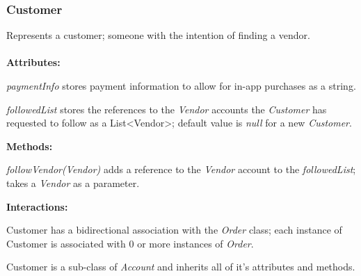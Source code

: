 \subsubsection{Customer}
Represents a customer; someone with the intention of finding a vendor. \\ \\
\textbf{Attributes:}
\begin{description}
\item \textit{paymentInfo} stores payment information to allow for in-app purchases as a string.
\item \textit{followedList} stores the references to the \emph{Vendor} accounts the \emph{Customer} has requested to follow as a List<Vendor>; default value is \textit{null} for a new \emph{Customer}.
\end{description}
\textbf{Methods:}
\begin{description}
\item\textit{followVendor(Vendor)} adds a reference to the \emph{Vendor} account to the \emph{followedList}; takes a \emph{Vendor} as a parameter.
\end{description}
\textbf{Interactions:}
\begin{description}
\item Customer has a bidirectional association with the \emph{Order} class; each instance of Customer is associated with 0 or more instances of \emph{Order}.
\item Customer is a sub-class of \emph{Account} and inherits all of it's attributes and methods.
\end{description}
\vspace{.2cm}
